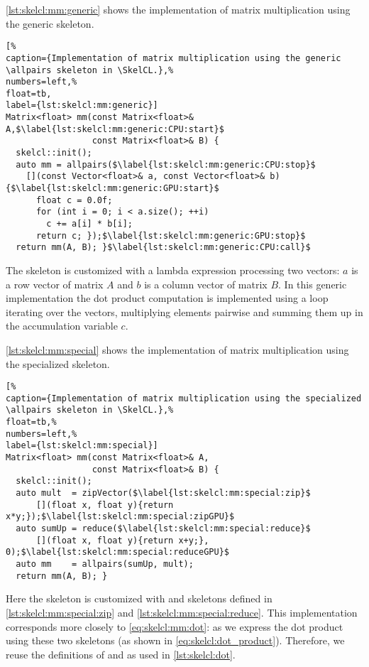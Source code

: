 \autoref{lst:skelcl:mm:generic} shows the implementation of matrix multiplication using the generic \allpairs skeleton.
\begin{lstlisting}[%                                                             
caption={Implementation of matrix multiplication using the generic \allpairs skeleton in \SkelCL.},%
numbers=left,%
float=tb,
label={lst:skelcl:mm:generic}]
Matrix<float> mm(const Matrix<float>& A,$\label{lst:skelcl:mm:generic:CPU:start}$
                 const Matrix<float>& B) {
  skelcl::init();
  auto mm = allpairs($\label{lst:skelcl:mm:generic:CPU:stop}$
    [](const Vector<float>& a, const Vector<float>& b) {$\label{lst:skelcl:mm:generic:GPU:start}$
      float c = 0.0f;
      for (int i = 0; i < a.size(); ++i)
        c += a[i] * b[i];
      return c; });$\label{lst:skelcl:mm:generic:GPU:stop}$
  return mm(A, B); }$\label{lst:skelcl:mm:generic:CPU:call}$
\end{lstlisting}
The skeleton is customized with a lambda expression processing two vectors:
$a$ is a row vector of matrix $A$ and $b$ is a column vector of matrix $B$.
In this generic implementation the dot product computation is implemented using a  loop iterating over the vectors, multiplying elements pairwise and summing them up in the accumulation variable $c$.

\autoref{lst:skelcl:mm:special} shows the implementation of matrix multiplication using the specialized \allpairs skeleton.
\begin{lstlisting}[%                                                             
caption={Implementation of matrix multiplication using the specialized \allpairs skeleton in \SkelCL.},%
float=tb,%                                                                       
numbers=left,%
label={lst:skelcl:mm:special}]
Matrix<float> mm(const Matrix<float>& A,
                 const Matrix<float>& B) {
  skelcl::init();
  auto mult  = zipVector($\label{lst:skelcl:mm:special:zip}$
      [](float x, float y){return x*y;});$\label{lst:skelcl:mm:special:zipGPU}$
  auto sumUp = reduce($\label{lst:skelcl:mm:special:reduce}$
      [](float x, float y){return x+y;}, 0);$\label{lst:skelcl:mm:special:reduceGPU}$
  auto mm    = allpairs(sumUp, mult);
  return mm(A, B); }
\end{lstlisting}
Here the \allpairs skeleton is customized with \zip and \reduce skeletons defined in \autoref{lst:skelcl:mm:special:zip} and \autoref{lst:skelcl:mm:special:reduce}.
This implementation corresponds more closely to \autoref{eq:skelcl:mm:dot}:
as we express the dot product using these two skeletons (as shown in \autoref{eq:skelcl:dot_product}).
Therefore, we reuse the definitions of  and  as used in \autoref{lst:skelcl:dot}.

